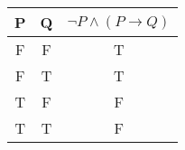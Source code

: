 \documentclass{article}
\begin{document}
\begin{tabular}{c|c|c}
    P   & Q   & $\neg P \land (P \to Q)$   \\
   \hline
    F   & F   & T                          \\
    F   & T   & T                          \\
    T   & F   & F                          \\
    T   & T   & F                          \\
   \end{tabular}
\end{document}
